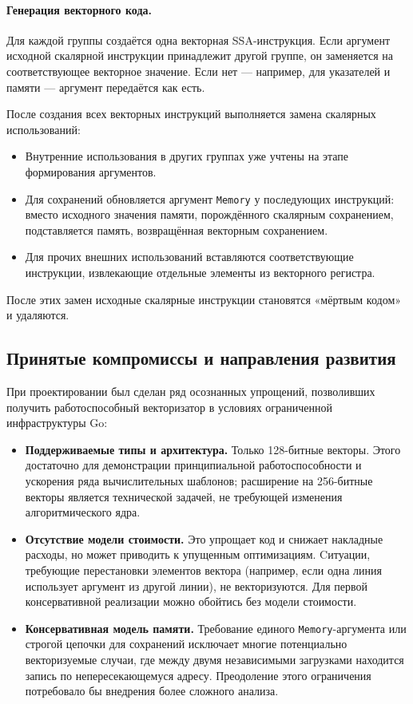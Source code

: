 \paragraph{Генерация векторного кода.}
Для каждой группы создаётся одна векторная SSA-инструкция. 
Если аргумент исходной скалярной инструкции принадлежит другой группе, он заменяется на соответствующее векторное значение. 
Если нет --- например, для указателей и памяти --- аргумент передаётся как есть.

После создания всех векторных инструкций выполняется замена скалярных использований:
\begin{itemize}
    \item Внутренние использования в других группах уже учтены на этапе формирования аргументов.
    \item Для сохранений обновляется аргумент \texttt{Memory} у последующих инструкций: 
    вместо исходного значения памяти, порождённого скалярным сохранением, подставляется память, возвращённая векторным сохранением.
    \item Для прочих внешних использований вставляются соответствующие инструкции, извлекающие отдельные элементы из векторного регистра.
\end{itemize}
После этих замен исходные скалярные инструкции становятся «мёртвым кодом» и удаляются.

\subsection{Принятые компромиссы и направления развития}
\label{sec:tradeoffs}

При проектировании был сделан ряд осознанных упрощений, позволивших получить работоспособный векторизатор в условиях ограниченной инфраструктуры Go:

\begin{itemize}
    \item \textbf{Поддерживаемые типы и архитектура.} Только 128-битные векторы.
    Этого достаточно для демонстрации принципиальной работоспособности и ускорения ряда вычислительных шаблонов;
    расширение на 256-битные векторы является технической задачей, не требующей изменения алгоритмического ядра.
    
    \item \textbf{Отсутствие модели стоимости.} Это упрощает код и снижает накладные расходы,
    но может приводить к упущенным оптимизациям. Cитуации, требующие перестановки элементов вектора 
    (например, если одна линия использует аргумент из другой линии), не векторизуются.
    Для первой консервативной реализации можно обойтись без модели стоимости.
    
    \item \textbf{Консервативная модель памяти.} Требование единого \texttt{Memory}-аргумента или 
    строгой цепочки для сохранений исключает многие потенциально векторизуемые случаи, 
    где между двумя независимыми загрузками находится запись по непересекающемуся адресу. 
    Преодоление этого ограничения потребовало бы внедрения более сложного анализа.
    
\end{itemize}

